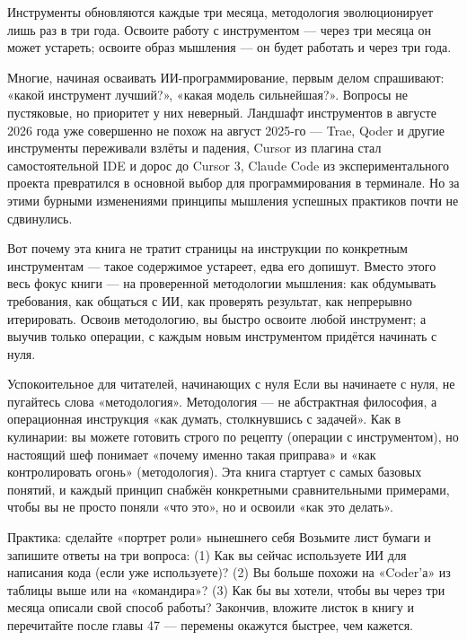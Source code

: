 
Инструменты обновляются каждые три месяца, методология эволюционирует лишь раз в три года. Освоите работу с инструментом — через три месяца он может устареть; освоите образ мышления — он будет работать и через три года.

Многие, начиная осваивать ИИ-программирование, первым делом спрашивают: «какой инструмент лучший?», «какая модель сильнейшая?». Вопросы не пустяковые, но приоритет у них неверный. Ландшафт инструментов в августе 2026 года уже совершенно не похож на август 2025-го — Trae, Qoder и другие инструменты переживали взлёты и падения, Cursor из плагина стал самостоятельной IDE и дорос до Cursor 3, Claude Code из экспериментального проекта превратился в основной выбор для программирования в терминале. Но за этими бурными изменениями принципы мышления успешных практиков почти не сдвинулись.

Вот почему эта книга не тратит страницы на инструкции по конкретным инструментам — такое содержимое устареет, едва его допишут. Вместо этого весь фокус книги — на проверенной методологии мышления: как обдумывать требования, как общаться с ИИ, как проверять результат, как непрерывно итерировать. Освоив методологию, вы быстро освоите любой инструмент; а выучив только операции, с каждым новым инструментом придётся начинать с нуля.

\begin{tcbinfo}{Успокоительное для читателей, начинающих с нуля}
Если вы начинаете с нуля, не пугайтесь слова «методология». Методология — не абстрактная философия, а операционная инструкция «как думать, столкнувшись с задачей». Как в кулинарии: вы можете готовить строго по рецепту (операции с инструментом), но настоящий шеф понимает «почему именно такая приправа» и «как контролировать огонь» (методология). Эта книга стартует с самых базовых понятий, и каждый принцип снабжён конкретными сравнительными примерами, чтобы вы не просто поняли «что это», но и освоили «как это делать».

\end{tcbinfo}

\begin{tcbpractice}{Практика: сделайте «портрет роли» нынешнего себя}
Возьмите лист бумаги и запишите ответы на три вопроса: (1) Как вы сейчас используете ИИ для написания кода (если уже используете)? (2) Вы больше похожи на «Coder'а» из таблицы выше или на «командира»? (3) Как бы вы хотели, чтобы вы через три месяца описали свой способ работы? Закончив, вложите листок в книгу и перечитайте после главы 47 — перемены окажутся быстрее, чем кажется.

\end{tcbpractice}


